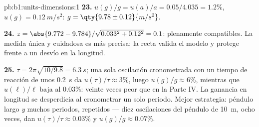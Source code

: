 \begin{solution}{pb:b1:units-dimensions:1}
\textbf{23.} $u(g)/g = u(a)/a = 0.05/4.035 = 1.2\%$, $u(g) =
\qty{0.12}{m/s^2}$: $g = \qty{9.78\pm0.12}{m/s^2}$.

\textbf{24.} $z = \abs{9.772 - 9.784}/\sqrt{0.033^2 + 0.12^2} = 0.1$:
plenamente compatibles. La medida única y cuidadosa es más precisa; la
recta valida el modelo y protege frente a un desvío en la longitud.

\textbf{25.} $\tau = 2\pi\sqrt{10/9.8} = \qty{6.3}{s}$; una sola
oscilación cronometrada con un tiempo de reacción de unos \qty{0.2}{s}
da $u(\tau)/\tau \approx
3\%$, luego $u(g)/g \approx 6\%$, mientras que $u(\ell)/\ell$ baja al
$0.03\%$: veinte veces peor que en la Parte IV. La ganancia en longitud
se desperdicia al cronometrar un solo periodo. Mejor estrategia: péndulo
largo \emph{y} muchos periodos, repetidos --- diez oscilaciones del
péndulo de \qty{10}{m}, ocho veces, dan $u(\tau)/\tau \approx 0.03\%$ y
$u(g)/g \approx 0.07\%$.
\end{solution}
